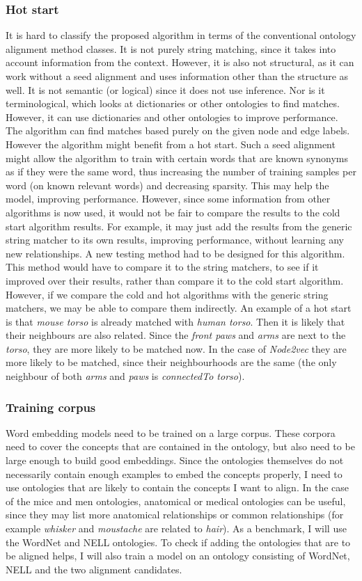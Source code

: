 \documentclass{article}
\begin{document}
  \subsubsection{Hot start}
  It is hard to classify the proposed algorithm in terms of the conventional ontology alignment method classes. It is not purely string matching, since it takes into account information from the context. However, it is also not structural, as it can work without a seed alignment and uses information other than the structure as well. It is not semantic (or logical) since it does not use inference. Nor is it terminological, which looks at dictionaries or other ontologies to find matches. However, it can use dictionaries and other ontologies to improve performance.
  The algorithm can find matches based purely on the given node and edge labels. However the algorithm might benefit from a hot start. Such a seed alignment might allow the algorithm to train with certain words that are known synonyms as if they were the same word, thus increasing the number of training samples per word (on known relevant words) and decreasing sparsity. This may help the model, improving performance. However, since some information from other algorithms is now used, it would not be fair to compare the results to the cold start algorithm results. For example, it may just add the results from the generic string matcher to its own results, improving performance, without learning any new relationships. A new testing method had to be designed for this algorithm. This method would have to compare it to the string matchers, to see if it improved over their results, rather than compare it to the cold start algorithm. However, if we compare the cold and hot algorithms with the generic string matchers, we may be able to compare them indirectly.
  An example of a hot start is that \emph{mouse torso} is already matched with \emph{human torso}. Then it is likely that their neighbours are also related. Since the \emph{front paws} and \emph{arms} are next to the \emph{torso}, they are more likely to be matched now. In the case of \emph{Node2vec} they are more likely to be matched, since their neighbourhoods are the same (the only neighbour of both \emph{arms} and \emph{paws} is \emph{connectedTo torso}).
 \subsubsection{Training corpus}
  Word embedding models need to be trained on a large corpus. These corpora need to cover the concepts that are contained in the ontology, but also need to be large enough to build good embeddings. Since the ontologies themselves do not necessarily contain enough examples to embed the concepts properly, I need to use ontologies that are likely to contain the concepts I want to align. In the case of the mice and men ontologies, anatomical or medical ontologies can be useful, since they may list more anatomical relationships or common relationships (for example \emph{whisker} and \emph{moustache} are related to \emph{hair}).
  As a benchmark, I will use the WordNet and NELL ontologies. To check if adding the ontologies that are to be aligned helps, I will also train a model on an ontology consisting of WordNet, NELL and the two alignment candidates.
\end{document}
